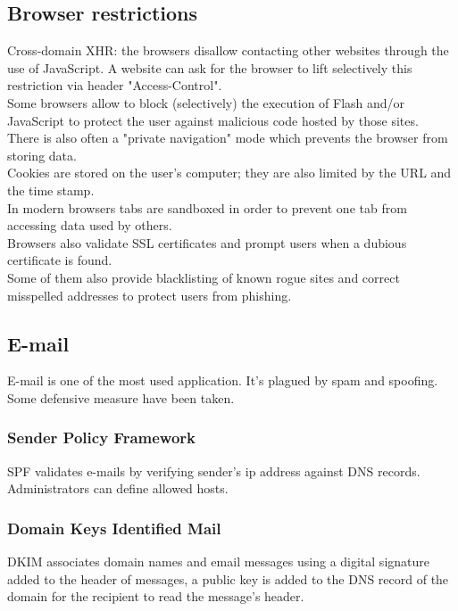 \subsection{Browser restrictions}
Cross-domain XHR: the browsers disallow contacting other websites
through the use of JavaScript. A website can ask for the browser to
lift selectively this restriction via header "Access-Control".\\
Some browsers allow to block (selectively) the execution of Flash and/or
JavaScript to protect the user against malicious code hosted by those sites.
\\
There is also often a "private navigation" mode which prevents the
browser from storing data.\\
Cookies are stored on the user's computer; they are also limited by the URL
and the time stamp.\\
In modern browsers tabs are sandboxed in order to prevent one tab from
accessing data used by others.
\\
Browsers also validate SSL certificates and prompt users when a
dubious certificate is found.\\
Some of them also provide blacklisting of known rogue sites and
correct misspelled addresses to protect users from phishing.

\subsection{E-mail}
E-mail is one of the most used application. It's plagued by spam and
spoofing. Some defensive measure have been taken.

\subsubsection{Sender Policy Framework}
SPF validates e-mails by verifying sender's ip address against DNS records.
Administrators can define allowed hosts.

\subsubsection{Domain Keys Identified Mail}
DKIM associates domain names and email messages using a digital signature
added to the header of messages, a public key is added to the DNS record of
the domain for the recipient to read the message's header.

